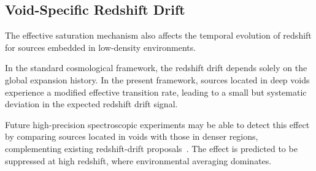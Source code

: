 \subsection{Void-Specific Redshift Drift}
  \label{subsec:redshift_drift}

  The effective saturation mechanism also affects the temporal evolution of
  redshift for sources embedded in low-density environments.

  In the standard cosmological framework, the redshift drift depends solely on the
  global expansion history.
  In the present framework, sources located in deep voids experience a modified
  effective transition rate, leading to a small but systematic deviation in the
  expected redshift drift signal.

  Future high-precision spectroscopic experiments may be able to detect this
  effect by comparing sources located in voids with those in denser regions,
  complementing existing redshift-drift proposals~\cite{Cai2017VoidLensing}.
  The effect is predicted to be suppressed at high redshift, where environmental
  averaging dominates.
